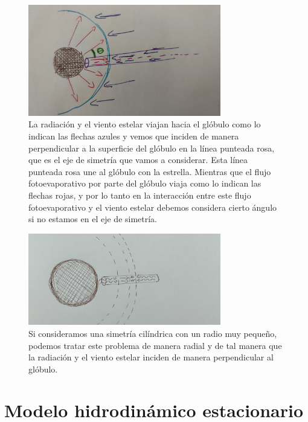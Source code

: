 \documentclass{book}
\begin{document}
\begin{figure}[h]
    \centering    \includegraphics[width=0.75\textwidth]{images Chapter 2/C2_angles.jpg}
    \caption{La radiación y el viento estelar viajan hacia el glóbulo como lo indican las flechas azules y vemos que inciden de manera perpendicular a la superficie del glóbulo en la línea punteada rosa, que es el eje de simetría que vamos a considerar. Esta línea punteada rosa une al glóbulo con la estrella. Mientras que el flujo fotoevaporativo por parte del glóbulo viaja como lo indican las flechas rojas, y por lo tanto en la interacción entre este flujo fotoevaporativo y el viento estelar debemos considera cierto ángulo si no estamos en el eje de simetría.}
    \label{fig:cilindross}
\end{figure}

\begin{figure}[h]
    \centering    \includegraphics[width=0.75\textwidth]{images Chapter 2/Chp2_cilinders.jpg}
    \caption{Si consideramos una simetría cilíndrica con un radio muy pequeño, podemos tratar este problema de manera radial y de tal manera que la radiación y el viento estelar inciden de manera perpendicular al glóbulo.}
    \label{fig:cilinders}
\end{figure}

\section{Modelo hidrodinámico estacionario}
\end{document}
